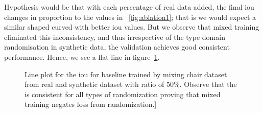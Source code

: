 Hypothesis would be that with each percentage of real data added, the final \gls{iou} changes in proportion to the values in ~\ref{fig:ablation1}; that is we would expect a similar shaped curved with better \gls{iou} values.
But we observe that mixed training eliminated this inconsistency, and thus irrespective of the type domain randomisation in synthetic data, the validation achieves good consistent performance.
Hence, we see a flat line in figure~\ref{fig:ablation2}.
\begin{figure}
    \centering
    \resizebox{0.7\textwidth}{!}{}
    \caption{Line plot for the \gls{iou}  for baseline trained by mixing chair dataset from real and synthetic dataset with ratio of 50\%.
    Observe that the  is consistent for all types of randomization proving that mixed training negates loss from randomization.]}
    \label{fig:ablation2}
\end{figure}
